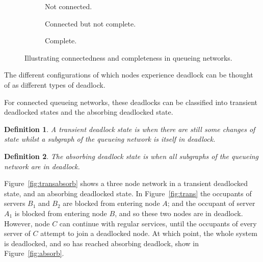 \documentclass{article}
\newtheorem{definition}{Definition}
\begin{document}
\begin{figure}[!htbp]
\begin{center}
\begin{subfigure}[b]{0.3\textwidth}
  
  \caption{Not connected.}
  \label{fig:connected}
\end{subfigure}
\begin{subfigure}[b]{0.3\textwidth}
  
  \caption{Connected but not complete.}
  \label{fig:notconnected}
\end{subfigure}
\begin{subfigure}[b]{0.3\textwidth}
  
  \caption{Complete.}
  \label{fig:complete}
\end{subfigure}
\end{center}
\caption{Illustrating connectedness and completeness in queueing networks.}
\label{fig:connectedcomplete}
\end{figure}

The different configurations of which nodes experience deadlock can be thought
of as different types of deadlock.

For connected queueing networks, these deadlocks can be classified into transient deadlocked states and the absorbing deadlocked state.\\


\begin{definition}
    A transient deadlock state is when there are still some changes of state
    whilst a subgraph of the queueing network is itself in deadlock.\\
\end{definition}

\begin{definition}
    The absorbing deadlock state is when all subgraphs of the
    queueing network are in deadlock.\\
\end{definition}

Figure~\ref{fig:transabsorb} shows a three node network in a transient deadlocked state, and an absorbing deadlocked state.
In Figure~\ref{fig:trans} the occupants of servers $B_1$ and $B_2$ are blocked from entering node $A$; and the occupant of server $A_1$ is blocked from entering node $B$, and so these two nodes are in deadlock.
However, node $C$ can continue with regular services, until the occupants of every server of $C$ attempt to join a deadlocked node.
At which point, the whole system is deadlocked, and so has reached absorbing deadlock, show in Figure~\ref{fig:absorb}.
\end{document}
